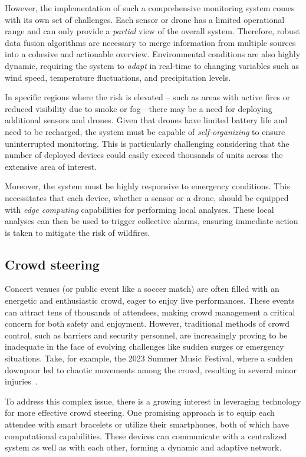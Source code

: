 However, the implementation of such a comprehensive monitoring system comes with its own set of challenges. 
 Each sensor or drone has a limited operational range and can only provide a \emph{partial} view of the overall system. 
 Therefore, robust data fusion algorithms are necessary to merge information from multiple sources into a cohesive and actionable overview. 
 Environmental conditions are also highly dynamic, requiring the system to \emph{adapt} in real-time to changing variables such as wind speed, temperature fluctuations, and precipitation levels.

In specific regions where the risk is elevated
 -- such as areas with active fires or reduced visibility due to smoke or fog—there may be a need for deploying additional sensors and drones. 
 Given that drones have limited battery life and need to be recharged, 
 the system must be capable of \emph{self-organizing} to ensure uninterrupted monitoring. 
 This is particularly challenging considering that the number of deployed devices could easily exceed thousands of units across the extensive area of interest.

Moreover, the system must be highly responsive to emergency conditions. 
 This necessitates that each device, whether a sensor or a drone, 
 should be equipped with \emph{edge computing} capabilities for performing local analyses. 
 These local analyses can then be used to trigger collective alarms, 
 ensuring immediate action is taken to mitigate the risk of wildfires.
\subsection{Crowd steering}
Concert venues (or public event like a soccer match) 
 are often filled with an energetic and enthusiastic crowd, 
 eager to enjoy live performances. 
 These events can attract tens of thousands of attendees, 
 making crowd management a critical concern for both safety and enjoyment. 
% 
However, traditional methods of crowd control, such as barriers and security personnel, 
 are increasingly proving to be inadequate in the face of evolving challenges like sudden surges or emergency situations. 
 Take, for example, the 2023 Summer Music Festival, 
 where a sudden downpour led to chaotic movements among the crowd, 
 resulting in several minor injuries~\cite{concertsafety:2023report}.

To address this complex issue, 
 there is a growing interest in leveraging technology for more effective crowd steering. 
 One promising approach is to equip each attendee with smart bracelets or utilize their smartphones, 
 both of which have computational capabilities. 
 These devices can communicate with a centralized system as well as with each other, 
 forming a dynamic and adaptive network.

